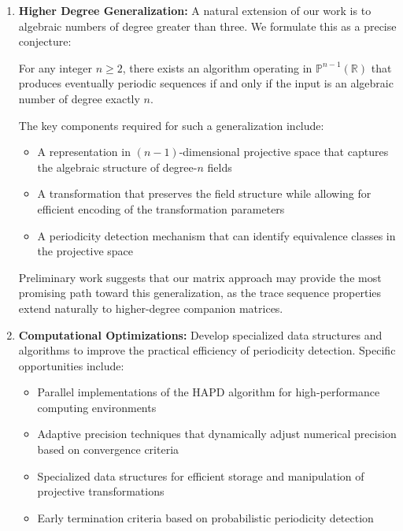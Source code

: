 \begin{enumerate}
\item \textbf{Higher Degree Generalization:} A natural extension of our work is to algebraic numbers of degree greater than three. We formulate this as a precise conjecture:

\begin{conjecture}\label{conj:higher_degree}
For any integer $n \geq 2$, there exists an algorithm operating in $\mathbb{P}^{n-1}(\mathbb{R})$ that produces eventually periodic sequences if and only if the input is an algebraic number of degree exactly $n$.
\end{conjecture}

The key components required for such a generalization include:
\begin{itemize}
\item A representation in $(n-1)$-dimensional projective space that captures the algebraic structure of degree-$n$ fields
\item A transformation that preserves the field structure while allowing for efficient encoding of the transformation parameters
\item A periodicity detection mechanism that can identify equivalence classes in the projective space
\end{itemize}

Preliminary work suggests that our matrix approach may provide the most promising path toward this generalization, as the trace sequence properties extend naturally to higher-degree companion matrices.

\item \textbf{Computational Optimizations:} Develop specialized data structures and algorithms to improve the practical efficiency of periodicity detection. Specific opportunities include:
\begin{itemize}
\item Parallel implementations of the HAPD algorithm for high-performance computing environments
\item Adaptive precision techniques that dynamically adjust numerical precision based on convergence criteria
\item Specialized data structures for efficient storage and manipulation of projective transformations
\item Early termination criteria based on probabilistic periodicity detection
\end{itemize}


\end{enumerate}
